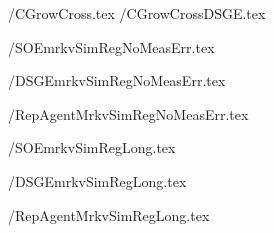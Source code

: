\documentclass{\econtex}\usepackage{\econtexSetup}\usepackage{\econtexShortcuts}\newcommand{\texname}{Tables}
\begin{document}



\newlength\TableWidth 

 \eq/CGrowCross.tex
 \TabsDir/CGrowCrossDSGE.tex

 \TabsDir/SOEmrkvSimRegNoMeasErr.tex

 \TabsDir/DSGEmrkvSimRegNoMeasErr.tex

 \TabsDir/RepAgentMrkvSimRegNoMeasErr.tex

 \TabsDir/SOEmrkvSimRegLong.tex

 \TabsDir/DSGEmrkvSimRegLong.tex

 \TabsDir/RepAgentMrkvSimRegLong.tex


\end{document}
